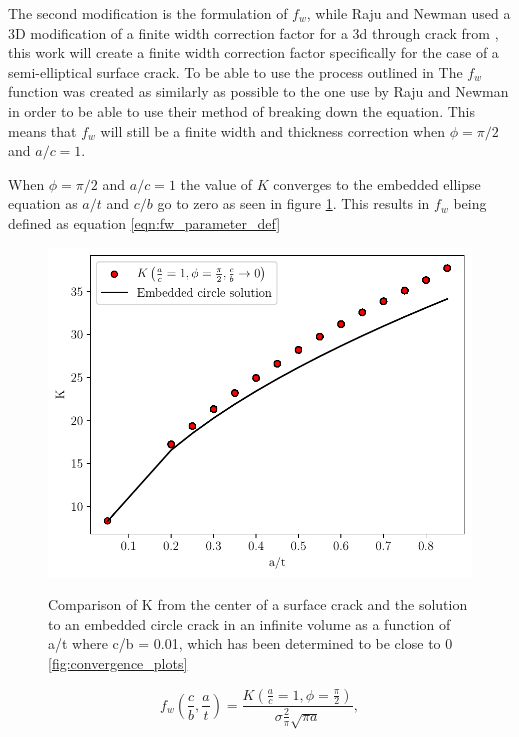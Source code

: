 The second modification is the formulation of $f_w$, while Raju and Newman used a 3D modification of a finite width correction factor for a 3d through crack from \cite{brown1966}, this work will create a finite width correction factor specifically for the case of a semi-elliptical surface crack. To be able to use the process outlined in \cite{RNeqnsbook} The $f_w$ function was created as similarly as possible to the one use by Raju and Newman in order to be able to use their method of breaking down the equation. This means that $f_w$ will still be a finite width and thickness correction when $\phi = \pi/2$ and $a/c = 1$. 

When $\phi = \pi/2$ and $a/c = 1$ the value of $K$ converges to the embedded ellipse equation as $a/t$ and $c/b$ go to zero as seen in figure \ref{fig:fw_convergence}. This results in $f_w$ being defined as equation \ref{eqn:fw_parameter_def}

\begin{figure}
    \centering
    \includegraphics[width=\textwidth]{Figures_pdf/fw_convergence.pdf}
    \label{fig:fw_convergence}
    \caption{Comparison of K from the center of a surface crack and the solution to an embedded circle crack in an infinite volume as a function of a/t where c/b = 0.01, which has been determined to be close to 0 \ref{fig:convergence_plots}}
\end{figure}


\begin{equation} \label{eqn:fw_parameter_def}
    f_w\left(\frac{c}{b}, \frac{a}{t}\right) = \frac{K\left(\frac{a}{c} = 1, \phi = \frac{\pi}{2}\right)}{\sigma \frac{2}{\pi} \sqrt{\pi a}},
\end{equation}

